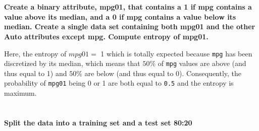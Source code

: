 \documentclass[
  12pt,
  oneside]{report}
\newenvironment{Shaded}{\begin{snugshade}}{\end{snugshade}}
\newcommand{\CommentTok}[1]{\textcolor[rgb]{0.56,0.35,0.01}{\textit{#1}}}
\newcommand{\DataTypeTok}[1]{\textcolor[rgb]{0.13,0.29,0.53}{#1}}
\newcommand{\DecValTok}[1]{\textcolor[rgb]{0.00,0.00,0.81}{#1}}
\newcommand{\KeywordTok}[1]{\textcolor[rgb]{0.13,0.29,0.53}{\textbf{#1}}}
\newcommand{\NormalTok}[1]{#1}
\newcommand{\OperatorTok}[1]{\textcolor[rgb]{0.81,0.36,0.00}{\textbf{#1}}}
\newcommand{\StringTok}[1]{\textcolor[rgb]{0.31,0.60,0.02}{#1}}
\begin{document}
\hypertarget{section-2}{%
\section{}\label{section-2}}

\textbf{Create a binary attribute, mpg01, that contains a 1 if mpg contains a value above its median,
and a 0 if mpg contains a value below its median. Create a single data set containing both mpg01 and the other Auto attributes except mpg. Compute entropy of mpg01.}

\begin{Shaded}
\end{Shaded}

Here, the entropy of \(mpg01 =\) 1 which is totally expected because \texttt{mpg} has been discretized by its median, which means that \(50\%\) of \texttt{mpg} values are above (and thus equal to 1) and \(50\%\) are below (and thus equal to 0). Consequently, the probability of \texttt{mpg01} being 0 or 1 are both equal to \texttt{0.5} and the entropy is maximum.

\hypertarget{section-3}{%
\section{}\label{section-3}}

\textbf{Split the data into a training set and a test set 80:20}
\end{document}
